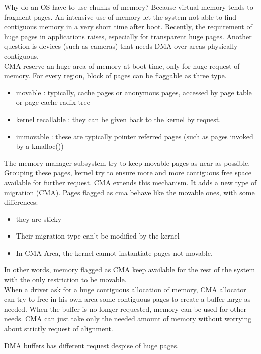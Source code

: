 \documentclass[a4paper,10pt]{article}
\begin{document}
\begin{multicols}{2}
Why do an OS have to use chunks of memory? Because virtual memory tends to fragment
pages. An intensive use of memory let the system not able to find contiguous memory in a
very short time after boot.
Recently, the requirement of huge pages in applications raises, especially for transparent huge pages.
Another question is devices (such as cameras) that needs DMA over areas physically contiguous.
\\
CMA reserve an huge area of memory at boot time, only for huge request of memory.
For every region, block of pages can be flaggable as three type.
\begin{itemize}
 \item movable : typically, cache pages or anonymous pages, accessed by page table or page cache radix tree
 \item kernel recallable : they can be given back to the kernel by request.
 \item immovable : these are typically pointer referred pages (such as pages invoked by a kmalloc()) 
\end{itemize}
The memory manager subsystem try to keep movable pages as near as possible. Grouping these pages, kernel try to ensure more
and more contiguous free space available for further request.
CMA extends this mechanism. It adds a new type of migration (CMA). Pages flagged as cma behave like the movable ones, with some
differences:
\begin{itemize}
 \item they are sticky
 \item Their migration type can't be modified by the kernel
 \item In CMA Area, the kernel cannot instantiate pages not movable.
\end{itemize}
In other words, memory flagged as CMA keep available for the rest of the system with the only restriction to be movable. \\
When a driver ask for a huge contiguous allocation of memory, CMA allocator can try to free in his own area some contiguous pages 
to create a buffer large as needed. When the buffer is no longer requested, memory can be used for other needs.
CMA can just take only the needed amount of memory without worrying about strictly request of alignment.

DMA buffers has different request despise of huge pages.

\begin{table}
\end{table}


\end{multicols}
\end{document}
